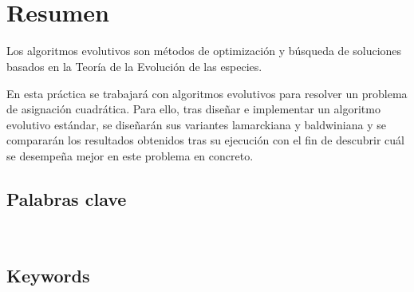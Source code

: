 \newpage

\begin{center}
  {\LARGE\bfseries\titulo}\\
\end{center}
\begin{center}
  \autor\
\end{center}

\section*{Resumen}

\bigskip

Los algoritmos evolutivos son métodos de optimización y búsqueda de soluciones basados en la Teoría de la Evolución de las especies.

\bigskip

En esta práctica se trabajará con algoritmos evolutivos para resolver un problema de asignación cuadrática. Para ello, tras diseñar e implementar un algoritmo evolutivo estándar, se diseñarán sus variantes lamarckiana y baldwiniana y se compararán los resultados obtenidos tras su ejecución con el fin de descubrir cuál se desempeña mejor en este problema en concreto.

\bigskip

\subsection*{Palabras clave}
\textit{\keywords}\\

\subsection*{Keywords}
\textit{\keywordsen}\\